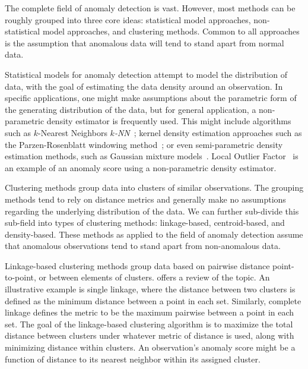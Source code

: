 
The complete field of anomaly detection is vast.  However, most methods can be 
    roughly grouped into three core ideas: statistical model approaches, 
    non-statistical model approaches, and clustering methods.  Common to all
    approaches is the assumption that anomalous data will tend to stand
    apart from normal data.

Statistical models for anomaly detection attempt to model the distribution 
    of data, with the goal of estimating the data density around an observation.
    In specific applications, one might
    make assumptions about the parametric form of the generating distribution
    of the data, but for general application, a non-parametric density estimator
    is frequently used.  This might include algorithms such as
    $k$-Nearest Neighbors  \emph{$k$-NN}~\citep{kramer2013}; 
    kernel density estimation approaches such as the Parzen-Rosenblatt 
    windowing method~\citep{rosenblatt1956,parzen1962}; 
    or even semi-parametric density estimation methods, such as Gaussian mixture 
    models~\citep{mcnicholas2010}.  Local Outlier Factor~\cite{breunig2000} is 
    an example of an anomaly score using a non-parametric density estimator.

Clustering methods group data into clusters of similar observations.
    The grouping methods tend to rely on distance metrics and generally make no 
    assumptions regarding the underlying distribution of the data.  We can 
    further sub-divide this sub-field into types of clustering methods: 
    linkage-based, centroid-based, and density-based. These methods as applied 
    to the field of anomaly detection assume that anomalous observations tend 
    to stand apart from non-anomalous data.  
    
Linkage-based clustering methods group data based on pairwise distance 
    point-to-point, or between elements of clusters.  \cite{ackerman2010} offers
    a review of the topic.  An illustrative example is single linkage, where 
    the distance between two clusters is defined as the minimum distance 
    between a point in each set.   Similarly, complete linkage defines the 
    metric to be the maximum pairwise between a point in each set.  The goal of 
    the linkage-based clustering algorithm is to maximize the total distance 
    between clusters under whatever metric of distance is used, along with 
    minimizing distance within clusters.  An observation's anomaly score might 
    be a function of distance to its nearest neighbor within its assigned 
    cluster.

